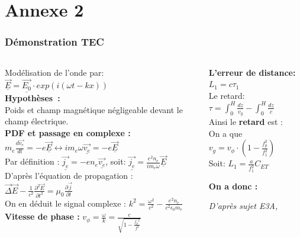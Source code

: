 \documentclass[xcolor=dvipsnames,envcountsect]{beamer}
\begin{document}
\section{Annexe 2}
\begin{frame}
	\label{appendix:2}
	\frametitle{Démonstration TEC}

	\begin{columns}
		\begin{column}{0.5\textwidth}
			{\small Modélisation de l'onde par: $\vec{\underline{E}} = \vec{\underline{E_0}} \cdot exp(i(\omega t - kx))$ \\
			\textbf{Hypothèses :} \\ Poids et champ magnétique négligeable devant le champ électrique.\\ 
			\textbf{PDF et passage en complexe :} $m_e \frac{d \vec{\underline{v_e}}}{dt} = -e \vec{\underline{E}} \leftrightarrow i m_e \omega \vec{\underline{v_e}} = -e \vec{\underline{E}}$
			\\ Par définition : $\vec{\underline{j_e}}= -e n_e \vec{\underline{v_e}}$, soit: $\vec{\underline{j_e}} = \frac{e^2 n_e}{i m_e \omega} \vec{\underline{E}}$ \\
			D'après l'équation de propagation : $\vec{\Delta} \vec E - \frac{1}{c^2} \frac{\partial^2 \vec E}{\partial t^2} = \mu_0 \frac{\partial \vec j}{\partial t}$ \\
			On en déduit le signal complexe : $k^2 = \frac{\omega^2}{c^2} - \frac{e^2 n_e}{c^2 \epsilon_0 m_e}$ \\
			\textbf{Vitesse de phase :} $v_{\phi} = \frac{\omega}{k} = \frac{c}{\sqrt{1 - \frac{{f_p}^2}{f^2}}}$ \\
			
			}
			\end{column}

		\begin{column}{0.5\textwidth}
				{\small \textbf{L'erreur de distance:} $L_1=c \tau_1$ \\
				Le retard: $\tau=\int_{0}^{H} \frac{dz}{v_g} - \int_{0}^{H} \frac{dz}{c} $ \\
				Ainsi le \textbf{retard} est :  \\
				On a que $v_g=v_{\phi} \cdot (1-\frac{f_p^2}{f_1^2})$ \\
				Soit: $L_1=\frac{a}{f_1^2} C_{ET}$ \newline

				\textbf{On a donc :} \newline}

			\begin{flushright}
				{\tiny \textit{D'après sujet E3A, \cite{e3a}}}
			\end{flushright}
		\end{column}
	\end{columns}
\end{frame}
\end{document}
